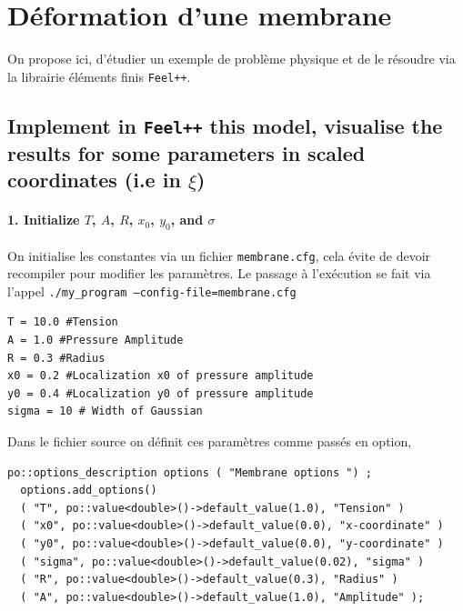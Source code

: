 \documentclass[a4paper,oneside,10pt]{report}
\begin{document}
\def\chaptername{travaux pratiques} 
\pagestyle{plain}

\chapter{Déformation d'une membrane}

On propose ici, d'étudier un exemple de problème physique et de le résoudre via la librairie éléments finis \texttt{Feel++}.
\section{Implement in \texttt{Feel++} this model, visualise the results for some parameters in scaled coordinates (i.e in $\xi$)}

\subsubsection{1. Initialize $T$, $A$, $R$, $x_0$, $y_0$, and $\sigma$}

On initialise les constantes via un fichier \texttt{membrane.cfg}, cela évite de devoir recompiler pour modifier les paramètres. Le passage à l'exécution se fait via l'appel  \texttt{./my\_program --config-file=membrane.cfg}

\begin{center}
\begin{minipage}{\textwidth}
\begin{lstlisting}[label=code2,caption=Contenu du fichier membrane.cfg ]
T = 10.0 #Tension
A = 1.0 #Pressure Amplitude
R = 0.3 #Radius
x0 = 0.2 #Localization x0 of pressure amplitude
y0 = 0.4 #Localization y0 of pressure amplitude
sigma = 10 # Width of Gaussian
\end{lstlisting}
\end{minipage}
\end{center}

Dans le fichier source on définit ces paramètres comme passés en option,


\begin{center}
\begin{minipage}{\textwidth}
\begin{lstlisting}[label=code2,caption=membrane.cpp - Définition des options]
  po::options_description options ( "Membrane options ") ;
  options.add_options()
  ( "T", po::value<double>()->default_value(1.0), "Tension" )
  ( "x0", po::value<double>()->default_value(0.0), "x-coordinate" )
  ( "y0", po::value<double>()->default_value(0.0), "y-coordinate" )
  ( "sigma", po::value<double>()->default_value(0.02), "sigma" )
  ( "R", po::value<double>()->default_value(0.3), "Radius" )
  ( "A", po::value<double>()->default_value(1.0), "Amplitude" );
\end{lstlisting}
\end{minipage}
\end{center}
\end{document}
